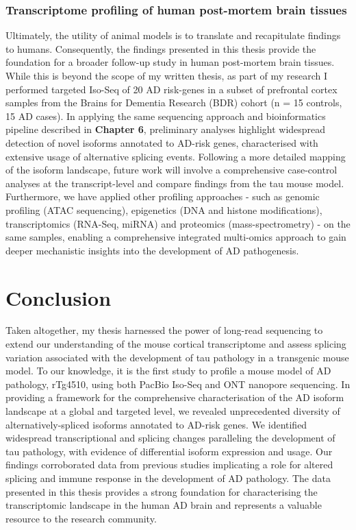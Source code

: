 \subsubsection{Transcriptome profiling of human post-mortem brain tissues}  
Ultimately, the utility of animal models is to translate and recapitulate findings to humans. Consequently, the findings presented in this thesis provide the foundation for a broader follow-up study in human post-mortem brain tissues. While this is beyond the scope of my written thesis, as part of my research I performed targeted Iso-Seq of 20 AD risk-genes in a subset of prefrontal cortex samples from the Brains for Dementia Research (BDR) cohort (n = 15 controls, 15 AD cases). In applying the same sequencing approach and bioinformatics pipeline described in \textbf{Chapter 6}, preliminary analyses highlight widespread detection of novel isoforms annotated to AD-risk genes, characterised with extensive usage of alternative splicing events. Following a more detailed mapping of the isoform landscape, future work will involve a comprehensive case-control analyses at the transcript-level and compare findings from the tau mouse model. Furthermore, we have applied other profiling approaches - such as genomic profiling (ATAC sequencing), epigenetics (DNA and histone modifications), transcriptomics (RNA-Seq, miRNA) and proteomics (mass-spectrometry) - on the same samples, enabling a comprehensive integrated multi-omics approach to gain deeper mechanistic insights into the development of AD pathogenesis.     

\section{Conclusion}
Taken altogether, my thesis harnessed the power of long-read sequencing to extend our understanding of the mouse cortical transcriptome and assess splicing variation associated with the development of tau pathology in a transgenic mouse model. To our knowledge, it is the first study to profile a mouse model of AD pathology, rTg4510, using both PacBio Iso-Seq and ONT nanopore sequencing. In providing a framework for the comprehensive characterisation of the AD isoform landscape at a global and targeted level, we revealed unprecedented diversity of alternatively-spliced isoforms annotated to AD-risk genes. We identified widespread transcriptional and splicing changes paralleling the development of tau pathology, with evidence of differential isoform expression and usage. Our findings corroborated data from previous studies implicating a role for altered splicing and immune response in the development of AD pathology. The data presented in this thesis provides a strong foundation for characterising the transcriptomic landscape in the human AD brain and represents a valuable resource to the research community.     